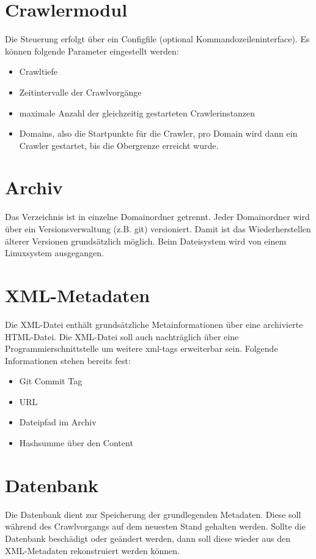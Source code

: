\chapter{Crawlermodul}

Die Steuerung erfolgt über ein Configfile (optional Kommandozeileninterface).
Es können folgende Parameter eingestellt werden:
\begin{itemize}
	\item Crawltiefe
	\item Zeitintervalle der Crawlvorgänge
	\item maximale Anzahl der gleichzeitig gestarteten Crawlerinstanzen
	\item Domains, also die Startpunkte für die Crawler, pro Domain wird dann ein Crawler gestartet,
		bis die Obergrenze erreicht wurde.
\end{itemize}

\chapter{Archiv}
Das Verzeichnis ist in einzelne Domainordner getrennt. Jeder Domainordner wird über ein Versionsverwaltung
(z.B. git) versioniert. Damit ist das Wiederherstellen älterer Versionen grundsätzlich möglich.
Beim Dateisystem wird von einem Linuxsystem ausgegangen.

\chapter{XML-Metadaten}
Die XML-Datei enthält grundsätzliche Metainformationen über eine archivierte HTML-Datei.
Die XML-Datei soll auch nachträglich über eine Programmierschnittstelle um weitere xml-tags erweiterbar sein.
Folgende Informationen stehen bereits fest: 
\begin{itemize}
	\item Git Commit Tag
	\item URL
	\item Dateipfad im Archiv
	\item Hashsumme über den Content
\end{itemize}

\chapter{Datenbank}
Die Datenbank dient zur Speicherung der grundlegenden Metadaten.
Diese soll während des Crawlvorgangs auf dem neuesten Stand gehalten werden.
Sollte die Datenbank beschädigt oder geändert werden, dann soll diese wieder aus den
XML-Metadaten rekonstruiert werden können.
 
